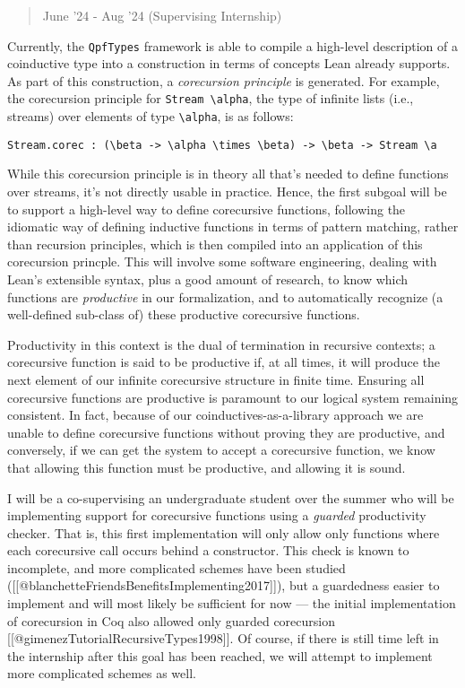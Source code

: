 \begin{quote}
June '24 - Aug '24 (Supervising Internship)
\end{quote}

Currently, the \texttt{QpfTypes} framework is able to compile a
high-level description of a coinductive type into a construction in
terms of concepts Lean already supports. As part of this construction, a
\emph{corecursion principle} is generated. For example, the corecursion
principle for \texttt{Stream\ \textbackslash{}alpha}, the type of
infinite lists (i.e., streams) over elements of type
\texttt{\textbackslash{}alpha}, is as follows:

\begin{verbatim}
Stream.corec : (\beta -> \alpha \times \beta) -> \beta -> Stream \a
\end{verbatim}

While this corecursion principle is in theory all that's needed to
define functions over streams, it's not directly usable in practice.
Hence, the first subgoal will be to support a high-level way to define
corecursive functions, following the idiomatic way of defining inductive
functions in terms of pattern matching, rather than recursion
principles, which is then compiled into an application of this
corecursion princple. This will involve some software engineering,
dealing with Lean's extensible syntax, plus a good amount of research,
to know which functions are \emph{productive} in our formalization, and
to automatically recognize (a well-defined sub-class of) these
productive corecursive functions.

Productivity in this context is the dual of termination in recursive
contexts; a corecursive function is said to be productive if, at all
times, it will produce the next element of our infinite corecursive
structure in finite time. Ensuring all corecursive functions are
productive is paramount to our logical system remaining consistent. In
fact, because of our coinductives-as-a-library approach we are unable to
define corecursive functions without proving they are productive, and
conversely, if we can get the system to accept a corecursive function,
we know that allowing this function must be productive, and allowing it
is sound.

I will be a co-supervising an undergraduate student over the summer who
will be implementing support for corecursive functions using a
\emph{guarded} productivity checker. That is, this first implementation
will only allow only functions where each corecursive call occurs behind
a constructor. This check is known to incomplete, and more complicated
schemes have been studied
({[}{[}@blanchetteFriendsBenefitsImplementing2017{]}{]}), but a
guardedness easier to implement and will most likely be sufficient for
now --- the initial implementation of corecursion in Coq also allowed
only guarded corecursion {[}{[}@gimenezTutorialRecursiveTypes1998{]}{]}.
Of course, if there is still time left in the internship after this goal
has been reached, we will attempt to implement more complicated schemes
as well.


